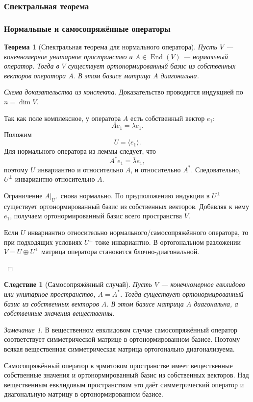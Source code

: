 \documentclass[12pt,a4paper]{article}
\theoremstyle{definition}
\theoremstyle{plain}
\newtheorem{theorem}[definition]{Теорема}
\newtheorem{corollary}[definition]{Следствие}
\theoremstyle{remark}
\newtheorem{remark}[definition]{Замечание}
\newenvironment{knowledgefix}{\begin{clarifybox}}{\end{clarifybox}}
\newcommand{\End}{\operatorname{End}}
\begin{document}
\subsubsection{Спектральная теорема}

\subsubsection*{Нормальные и самосопряжённые операторы}

\begin{theorem}[Спектральная теорема для нормального оператора]
Пусть $V$ --- конечномерное унитарное пространство и $A\in\End(V)$ --- нормальный оператор.
Тогда в $V$ существует ортонормированный базис из собственных векторов оператора $A$.
В этом базисе матрица $A$ диагональна.
\end{theorem}

\begin{proof}[Схема доказательства из конспекта]
Доказательство проводится индукцией по $n=\dim V$.

Так как поле комплексное, у оператора $A$ есть собственный вектор $e_1$:
\[
    Ae_1=\lambda e_1.
\]
Положим
\[
    U=\langle e_1\rangle.
\]
Для нормального оператора из леммы следует, что
\[
    A^*e_1=\overline\lambda e_1,
\]
поэтому $U$ инвариантно и относительно $A$, и относительно $A^*$.
Следовательно, $U^\perp$ инвариантно относительно $A$.

Ограничение $A|_{U^\perp}$ снова нормально. По предположению индукции в $U^\perp$ существует ортонормированный базис из собственных векторов.
Добавляя к нему $e_1$, получаем ортонормированный базис всего пространства $V$.
\begin{knowledgefix}
Если \(U\) инвариантно относительно нормального/самосопряжённого оператора, то при подходящих условиях \(U^\perp\) тоже инвариантно. В ортогональном разложении \(V=U\oplus U^\perp\) матрица оператора становится блочно-диагональной.
\end{knowledgefix}
\end{proof}

\begin{corollary}[Самосопряжённый случай]
Пусть $V$ --- конечномерное евклидово или унитарное пространство, $A=A^*$.
Тогда существует ортонормированный базис из собственных векторов $A$.
В этом базисе матрица $A$ диагональна, а собственные значения вещественны.
\end{corollary}

\begin{remark}
В вещественном евклидовом случае самосопряжённый оператор соответствует симметрической матрице в ортонормированном базисе.
Поэтому всякая вещественная симметрическая матрица ортогонально диагонализуема.
\begin{knowledgefix}
Самосопряжённый оператор в эрмитовом пространстве имеет вещественные собственные значения и ортонормированный базис из собственных векторов. Над вещественным евклидовым пространством это даёт симметрический оператор и диагональную матрицу в ортонормированном базисе.
\end{knowledgefix}
\end{remark}
\end{document}
